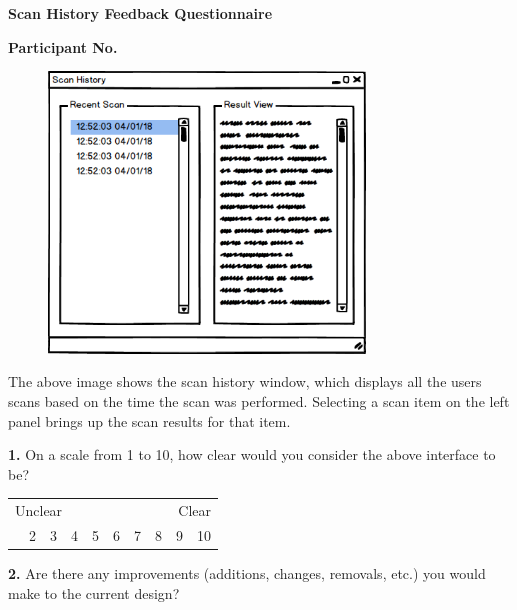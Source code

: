 \begin{center}
	\textbf{Scan History Feedback Questionnaire}\par
	\textbf{Participant No.}\par
\end{center}

\vspace{0.5cm}

\begin{figure}[h]
\begin{center}
	\includegraphics[width=0.75\textwidth]{img/scan_history_mockup.png}
\end{center}
\end{figure}

\vspace{0.5cm}

The above image shows the scan history window, which displays all the users scans based on the time the scan was
performed. Selecting a scan item on the left panel brings up the scan results for that item.

\vspace{0.5cm}

\textbf{1.} On a scale from 1 to 10, how clear would you consider the above interface to be?

\begin{center}
	\begin{table}[h]
	\label{my-label}
	\begin{tabularx}{\textwidth}{XXXXXXXXXX}
	\multicolumn{5}{l}{Unclear} & \multicolumn{5}{r}{Clear} \\
	\centering
	1    & 2    & 3    & 4    & 5    & 6    & 7    & 8    & 9    & 10
	\end{tabularx}
	\end{table}
\end{center}

\textbf{2.} Are there any improvements (additions, changes, removals, etc.) you would make to the current design?

\vspace{5cm}
